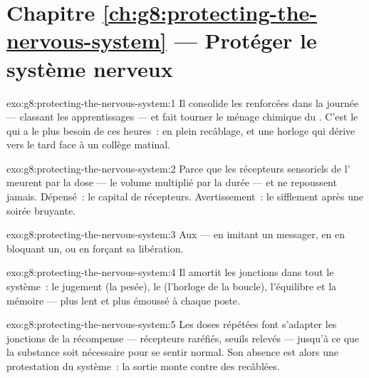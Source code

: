 \section*{Chapitre \ref{ch:g8:protecting-the-nervous-system} --- Protéger le système nerveux}

\begin{solution}{exo:g8:protecting-the-nervous-system:1}
Il consolide les  renforcées dans la journée ---
classant les apprentissages --- et fait tourner le ménage
chimique du . C'est le   qui a le
plus besoin de ces heures~: en plein recâblage, et une
horloge qui dérive vers le tard face à un collège matinal.
\end{solution}

\begin{solution}{exo:g8:protecting-the-nervous-system:2}
Parce que les récepteurs sensoriels de l' meurent
par la dose --- le volume multiplié par la durée --- et ne
repoussent jamais. Dépensé~: le capital de récepteurs.
Avertissement~: le sifflement après une soirée bruyante.
\end{solution}

\begin{solution}{exo:g8:protecting-the-nervous-system:3}
Aux  --- en imitant un messager, en en bloquant un,
ou en forçant sa libération.
\end{solution}

\begin{solution}{exo:g8:protecting-the-nervous-system:4}
Il amortit les jonctions dans tout le système~: le jugement
(la pesée), le  (l'horloge de la boucle),
l'équilibre et la mémoire --- plus lent et plus émoussé à
chaque poste.
\end{solution}

\begin{solution}{exo:g8:protecting-the-nervous-system:5}
Les doses répétées font s'adapter les jonctions de la
récompense --- récepteurs raréfiés, seuils relevés ---
jusqu'à ce que la substance soit nécessaire pour se sentir
normal. Son absence est alors une protestation du système~:
la sortie monte contre des  recâblées.
\end{solution}

